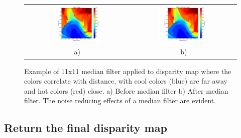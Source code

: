 \documentclass[11pt,fleqn]{article}
\begin{document}
\begin{figure}[!h]
\begin{mdframed}
\centering
\begin{tabular}{cc}
\includegraphics[width=0.49\textwidth, trim=60 10 25 10, clip]{images/median1.png} &
\includegraphics[width=0.49\textwidth, trim=60 10 25 10, clip]{images/median2.png}\\[2pt]
a) & b) \\
\end{tabular}
\caption[Example of 11x11 median filter applied to disparity map]{Example of 11x11 median filter applied to disparity map where the colors correlate with distance, with cool colors (blue) are far away and hot colors (red) close. a) Before median filter b) After median filter. 
The noise reducing effects of a median filter are evident.}
\label{fig:medians}
\end{mdframed}
\end{figure}

\subsection{Return the final disparity map}
\end{document}
